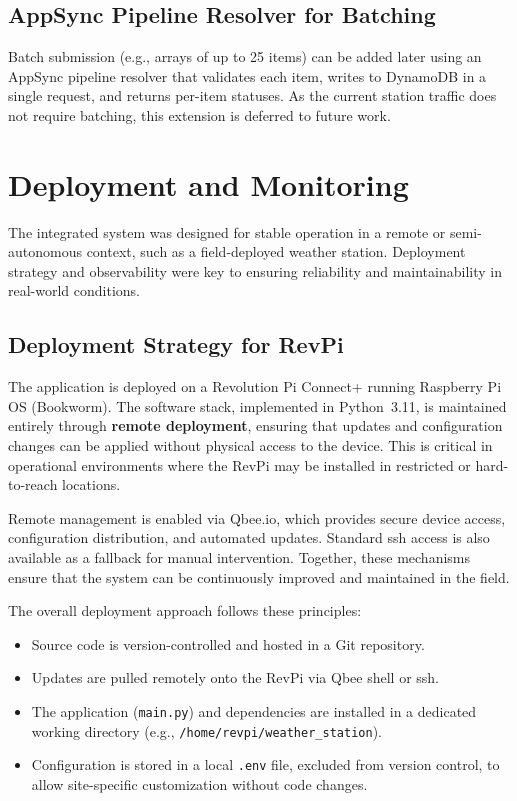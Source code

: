 \subsection{AppSync Pipeline Resolver for Batching}
Batch submission (e.g., arrays of up to 25 items) can be added later using an AppSync pipeline resolver that validates each item, writes to DynamoDB in a single request, and returns per-item statuses. As the current station traffic does not require batching, this extension is deferred to future work.


\section{Deployment and Monitoring}
\label{sec:deployment-monitoring}

The integrated system was designed for stable operation in a remote or semi-autonomous context, such as a field-deployed weather station. Deployment strategy and observability were key to ensuring reliability and maintainability in real-world conditions.


\subsection{Deployment Strategy for RevPi}

The application is deployed on a Revolution Pi Connect+ running Raspberry Pi OS
(Bookworm). The software stack, implemented in Python~3.11, is maintained entirely
through \textbf{remote deployment}, ensuring that updates and configuration changes
can be applied without physical access to the device. This is critical in operational
environments where the RevPi may be installed in restricted or hard-to-reach
locations.

Remote management is enabled via Qbee.io, which provides secure device access,
configuration distribution, and automated updates. Standard \gls{ssh} access is also
available as a fallback for manual intervention. Together, these mechanisms ensure
that the system can be continuously improved and maintained in the field.

The overall deployment approach follows these principles:
\begin{itemize}
    \item Source code is version-controlled and hosted in a Git repository.
    \item Updates are pulled remotely onto the RevPi via Qbee shell or \gls{ssh}.
    \item The application (\texttt{main.py}) and dependencies are installed in a
          dedicated working directory (e.g., \texttt{/home/revpi/weather\_station}).
    \item Configuration is stored in a local \texttt{.env} file, excluded from version
          control, to allow site-specific customization without code changes.
\end{itemize}

